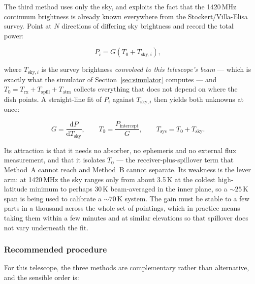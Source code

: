\documentclass[11pt,a4paper]{article}
\begin{document}
The third method uses only the sky, and exploits the fact that the 1420\,MHz continuum brightness is already known everywhere from the Stockert/Villa-Elisa survey. Point at $N$ directions of differing sky brightness and record the total power:

\begin{equation}
P_i = G\left(T_0 + T_{\text{sky},i}\right),
\end{equation}

where $T_{\text{sky},i}$ is the survey brightness \emph{convolved to this telescope's beam} --- which is exactly what the simulator of Section~\ref{sec:simulator} computes --- and $T_0 = T_\text{rx} + T_\text{spill} + T_\text{atm}$ collects everything that does not depend on where the dish points. A straight-line fit of $P_i$ against $T_{\text{sky},i}$ then yields both unknowns at once:

\begin{equation}
G = \frac{\mathrm{d}P}{\mathrm{d}T_\text{sky}}, \qquad
T_0 = \frac{P_\text{intercept}}{G}, \qquad
T_\text{sys} = T_0 + T_{\text{sky}}.
\end{equation}

Its attraction is that it needs no absorber, no ephemeris and no external flux measurement, and that it isolates $T_0$ --- the receiver-plus-spillover term that Method~A cannot reach and Method~B cannot separate. Its weakness is the lever arm: at 1420\,MHz the sky ranges only from about 3.5\,K at the coldest high-latitude minimum to perhaps 30\,K beam-averaged in the inner plane, so a $\sim25$\,K span is being used to calibrate a $\sim70$\,K system. The gain must be stable to a few parts in a thousand across the whole set of pointings, which in practice means taking them within a few minutes and at similar elevations so that spillover does not vary underneath the fit.

\subsubsection{Recommended procedure}

For this telescope, the three methods are complementary rather than alternative, and the sensible order is:
\end{document}
